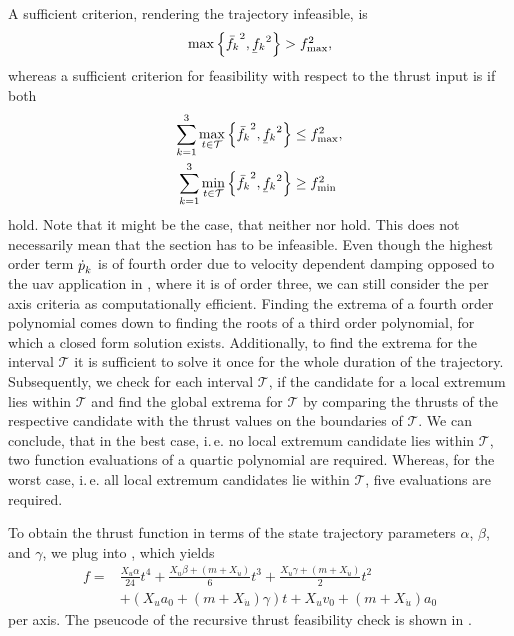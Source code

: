 A sufficient criterion, rendering the trajectory infeasible, is
\begin{equation}
	\label{eq:sufficient-infeasible-thrust}
	\max\left\{\fmaxaxis^2, \fminaxis^2\right\}
	> \fmaxsquare
	,
\end{equation}
whereas a sufficient criterion for feasibility with respect to the thrust input is if both
\begin{align}
	\label{eq:sufficient-feasible-thrust-max}
	\sum_{k=1}^{3}
	\max_{t \in \mathcal{T}}
	\left\{\fmaxaxis^2, \fminaxis^2\right\}
	& \leq
	\fmaxsquare, \\
	\label{eq:sufficient-feasible-thrust-min}
	\sum_{k=1}^{3}
	\min_{t \in \mathcal{T}}
	\left\{\fmaxaxis^2, \fminaxis^2\right\}
	& \geq
	\fminsquare
\end{align}
hold. 
Note that it might be the case, that neither  nor  hold. This does not necessarily mean that the section has to be infeasible. 
Even though the highest order term $\mbox{$\dot{p}$}_k$ is of fourth order due to velocity dependent damping opposed to the \ac{uav} application in \cite{MuellerHehn15}, where it is of order three, we can still consider the per axis criteria as computationally efficient. 
Finding the extrema of a fourth order polynomial comes down to finding the roots of a third order polynomial, for which a closed form solution exists. Additionally, to find the extrema for the interval $\mathcal{T}$ it is sufficient to solve it once for the whole duration of the trajectory. Subsequently, we check for each interval $\mathcal{T}$, if the candidate for a local extremum lies within $\mathcal{T}$ and find the global extrema for $\mathcal{T}$ by comparing the thrusts of the respective candidate with the thrust values on the boundaries of $\mathcal{T}$. We can conclude, that in the best case, i.\,e. no local extremum candidate lies within $\mathcal{T}$, two function evaluations of a quartic polynomial are required. Whereas, for the worst case, i.\,e. all local extremum candidates lie within $\mathcal{T}$, five evaluations are required.

To obtain the thrust function in terms of the state trajectory parameters $\alpha$, $\beta$, and $\gamma$, we plug  into , which yields
\begin{equation}
	\begin{aligned}
		f ={}
		&\frac{X_u \alpha}{24} t^4
		+ \frac{X_u \beta + \left(m+X_{\dot{u}}\right)}{6} t^3
		+ \frac{X_u \gamma + \left(m + X_{\dot{u}}\right)}{2} t^2 \\
		& + \left(
			X_u a_0 + \left(m + X_{\dot{u}}\right) \gamma
		\right) t
		+ X_u v_0
		+ \left(m + X_{\dot{u}}\right) a_0
\end{aligned}
\end{equation}
per axis. The pseucode of the recursive thrust feasibility check is shown in .


